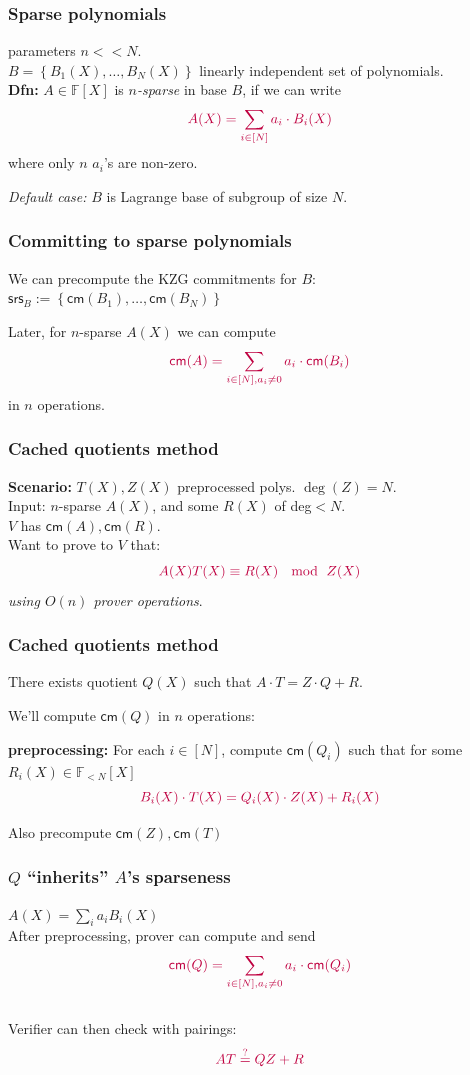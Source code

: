 \documentclass[shadesubsections,compress,14pt,mathserif]{beamer}
\newcommand{\F}{\ensuremath{{\mathbb F}}}
\newcommand{\set}[1]{\ensuremath{\left\{#1\right\}}}
\newcommand{\enc}[1]{\ensuremath{\left[#1\right ]}}
\newcommand{\cm}{\ensuremath{\mathsf{cm}}}
\newcommand{\kzg}[1]{\cm(#1)}
\newcommand{\defeq}{\ensuremath{:=}}
\newcommand{\polysofdeg}[1]{\F_{< #1}[X]}
\newcommand{\nl}{\\ \pause \vspace{0.2in}}
\newcommand{\srs}{\ensuremath{\mathsf{srs}}}
\begin{document}
 
\begin{frame}
 \frametitle{Sparse polynomials}
 parameters $n<<N$.\nl
 $B=\set{B_1(X),\ldots,B_N(X)}$ linearly independent set of polynomials.\nl
\textbf{Dfn:} $A\in \F[X]$  is \emph{$n$-sparse} in base $B$, if we can write
\[\color{purple} A(X)=\sum_{i\in [N]} a_i\cdot B_i(X)\]
where only $n$ $a_i$'s are non-zero.\nl

\emph{Default case:} $B$ is Lagrange base of subgroup of size $N$.
\end{frame}
% 
\begin{frame}
 \frametitle{Committing to sparse polynomials}
 We can precompute the KZG commitments for $B$:\\
$\srs_B \defeq \set{\kzg{B_1},\ldots,\kzg{B_N}}$\nl

Later, for $n$-sparse $A(X)$ we can compute 
\[\color{purple}\cm(A)=\sum_{i\in [N], a_i\neq 0} a_i\cdot \kzg{B_i}
\]
in $n$ operations. 
\end{frame}
\begin{frame}
 \frametitle{Cached quotients method}
 \textbf{Scenario:}
$T(X),Z(X)$ preprocessed polys. $\deg(Z)=N$.\nl
{\color{blue} Input:} $n$-sparse $A(X)$, and some $R(X)$ of deg$<N$.\\

$V$ has $\cm(A),\cm(R)$. \nl
Want to prove to $V$ that:
\[\color{purple}A(X)T(X)\equiv R(X) \; \mod\; Z(X)\]
 \textit{using $O(n)$ prover operations}.

\end{frame}
\begin{frame}
\frametitle{Cached quotients method}
There exists quotient $Q(X)$ such that $A\cdot T= Z\cdot Q+R$.\nl

We'll compute $\kzg{Q}$ in $n$ operations:\nl


\textbf{preprocessing:}
For each $i\in [N]$, compute $\kzg{Q_i}$ such that for some $R_i(X)\in \polysofdeg{N}$
\[\color{purple} B_i(X)\cdot T(X) = Q_i(X)\cdot Z(X) +R_i(X)\]\pause

Also precompute $\kzg{Z},\kzg{T}$
\end{frame}
\begin{frame}
\frametitle{$Q$ ``inherits'' $A$'s sparseness}
{\small \emph{$A(X)=\sum_{i} a_i B_i(X)$}}\\
After preprocessing, prover can compute and send
\[\color{purple} \kzg{Q}=\sum_{i\in [N],a_i\neq 0} a_i \cdot \kzg{Q_i}\]\nl
Verifier can then check with pairings:
\[\color{purple} AT\stackrel{?}{=}QZ+R\]
\end{frame}
\end{document}
